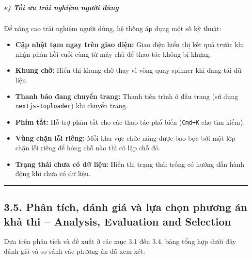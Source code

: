 \documentclass[a4paper]{extarticle}
\providecommand{\tightlist}{%
  \setlength{\itemsep}{0pt}\setlength{\parskip}{0pt}}
\begin{document}
\subparagraph{e) Tối ưu trải nghiệm người
dùng}\label{e-tux1ed1i-ux1b0u-trux1ea3i-nghiux1ec7m-ngux1b0ux1eddi-duxf9ng}

Để nâng cao trải nghiệm người dùng, hệ thống áp dụng một số kỹ thuật:

\begin{itemize}
\tightlist
\item
  \textbf{Cập nhật tạm ngay trên giao diện:} Giao diện hiển thị kết quả trước
  khi nhận phản hồi cuối cùng từ máy chủ để thao tác không bị khựng.
\item
  \textbf{Khung chờ:} Hiển thị khung chờ thay vì vòng quay spinner khi
  đang tải dữ liệu.
\item
  \textbf{Thanh báo đang chuyển trang:} Thanh tiến trình ở đầu trang (sử dụng
  \texttt{nextjs-toploader}) khi chuyển trang.
\item
  \textbf{Phím tắt:} Hỗ trợ phím tắt cho các thao tác phổ biến
  (\texttt{Cmd+K} cho tìm kiếm).
\item
  \textbf{Vùng chặn lỗi riêng:} Mỗi khu vực chức năng được bao bọc bởi
  một lớp chặn lỗi riêng để hỏng chỗ nào thì cô lập chỗ đó.
\item
  \textbf{Trạng thái chưa có dữ liệu:} Hiển thị trạng thái trống có hướng dẫn hành
  động khi chưa có dữ liệu.
\end{itemize}

\begin{center}\rule{0.5\linewidth}{0.5pt}\end{center}

\subsection{3.5. Phân tích, đánh giá và lựa chọn phương án khả thi --
Analysis, Evaluation and
Selection}\label{33-phuxe2n-tuxedch-ux111uxe1nh-giuxe1-vuxe0-lux1ef1a-chux1ecdn-phux1b0ux1a1ng-uxe1n-khux1ea3-thi--analysis-evaluation-and-selection}

Dựa trên phân tích và đề xuất ở các mục 3.1 đến 3.4, bảng tổng hợp dưới
đây đánh giá và so sánh các phương án đã xem xét:
\end{document}
